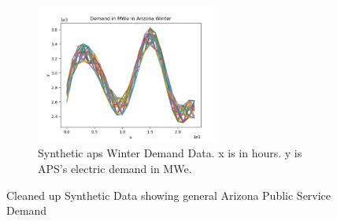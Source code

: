 \documentclass[12pt]{UIdahoMastersThesis}
\begin{document}
\begin{figure}[t!]
    \begin{subfigure}[t]{0.9\textwidth}
        \centering
        \includegraphics[height=1.8in]{Demand_in_MWe_in_Arizona_Winter_line.png}
        \caption{Synthetic \ac{aps} Winter Demand Data. x is in hours. y is APS's electric demand in MWe.}
    \end{subfigure}
    \caption{Cleaned up Synthetic Data showing general Arizona Public Service Demand}
\end{figure}
\end{document}
